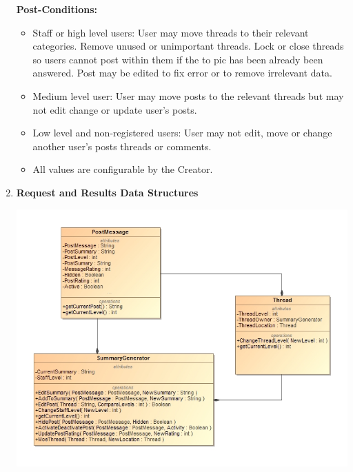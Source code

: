 \documentclass[11pt]{article}
\begin{document}
\begin{enumerate}
	\textbf{Post-Conditions: }
	\begin{itemize}
		\item Staff or high level users:
		User may move threads to their relevant categories. Remove unused or unimportant threads. Lock or close threads so users cannot post within them if the to	pic has been already been answered. Post may be edited to fix error or to remove irrelevant data.
		\item Medium level user:
		User may move posts to the relevant threads but may not edit change or update user’s posts.
		\item Low level and non-registered users:
		User may not edit, move or change another user’s posts threads or comments.
	 	\item All values are configurable by the Creator.
	\end{itemize}
	\newpage
			 \item	\textbf{Request and Results Data Structures}
			 	  		\begin{center}
			 	  			\includegraphics[scale=0.5]{Diagrams/B2 ClassDiagram.png}
			 	  		\end{center}
	

\end{enumerate}
\end{document}
